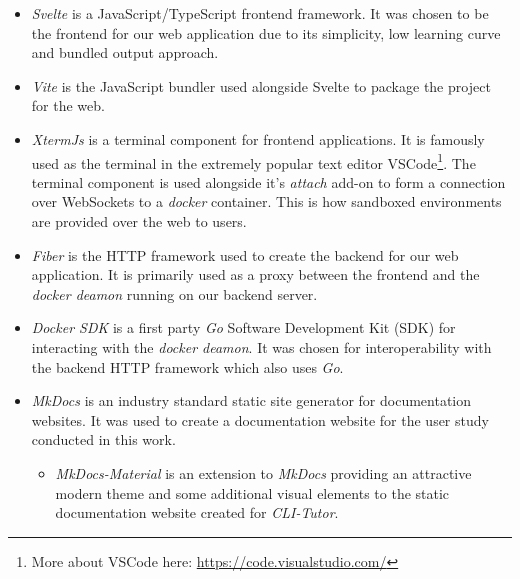 \begin{itemize}
    \item \textit{Svelte} is a JavaScript/TypeScript frontend framework. It was
        chosen to be the frontend for our web application due to its
        simplicity, low learning curve and bundled output approach.

    \item \textit{Vite} is the JavaScript bundler used alongside Svelte to package the project for the web.

    \item \textit{XtermJs} is a terminal component for frontend applications.
        It is famously used as the terminal in the extremely popular text
        editor VSCode\footnote{More about VSCode here:
        \url{https://code.visualstudio.com/}}. The terminal component is used
        alongside it's \textit{attach} add-on to form a connection over
        WebSockets to a \textit{docker} container. This is how sandboxed environments
        are provided over the web to users.

    \item \textit{Fiber} is the HTTP framework used to create the backend for
        our web application. It is primarily used as a proxy between the
        frontend and the \textit{docker deamon} running on our backend server.

    \item \textit{Docker SDK} is a first party \textit{Go} Software Development Kit
        (SDK) for interacting with the \textit{docker deamon}. It was chosen for
        interoperability with the backend HTTP framework which also uses \textit{Go}.

    \item \textit{MkDocs} is an industry standard static site generator for
        documentation websites. It was used to create a documentation website
        for the user study conducted in this work.
        \begin{itemize}
            \item \textit{MkDocs-Material} is an extension to \textit{MkDocs}
                providing an attractive modern theme and some additional visual
                elements to the static documentation website created for
                \textit{CLI-Tutor}.
        \end{itemize}
\end{itemize}


